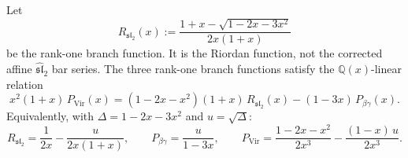 \begin{theorem}
\label{thm:discriminant-linear-dependence}
Let
\[
R_{\mathfrak{sl}_2}(x)
 := \frac{1 + x - \sqrt{1 - 2x - 3x^2}}{2x(1+x)}
\]
be the rank-one branch function.  It is the Riordan function, not the
corrected affine $\widehat{\mathfrak{sl}}_2$ bar series.  The three
rank-one branch functions satisfy the $\mathbb{Q}(x)$-linear relation
\begin{equation}\label{eq:discriminant-linear-relation}
x^2(1{+}x)\, P_{\mathrm{Vir}}(x)
= (1{-}2x{-}x^2)(1{+}x)\, R_{\mathfrak{sl}_2}(x)
 - (1{-}3x)\, P_{\beta\gamma}(x).
\end{equation}
Equivalently, with $\Delta = 1 - 2x - 3x^2$ and $u = \sqrt{\Delta}$:
\begin{equation}\label{eq:discriminant-family-decomposition}
R_{\mathfrak{sl}_2} = \frac{1}{2x} - \frac{u}{2x(1{+}x)},
\qquad
P_{\beta\gamma} = \frac{u}{1{-}3x},
\qquad
P_{\mathrm{Vir}} = \frac{1{-}2x{-}x^2}{2x^3} - \frac{(1{-}x)\,u}{2x^3}.
\end{equation}
\end{theorem}

